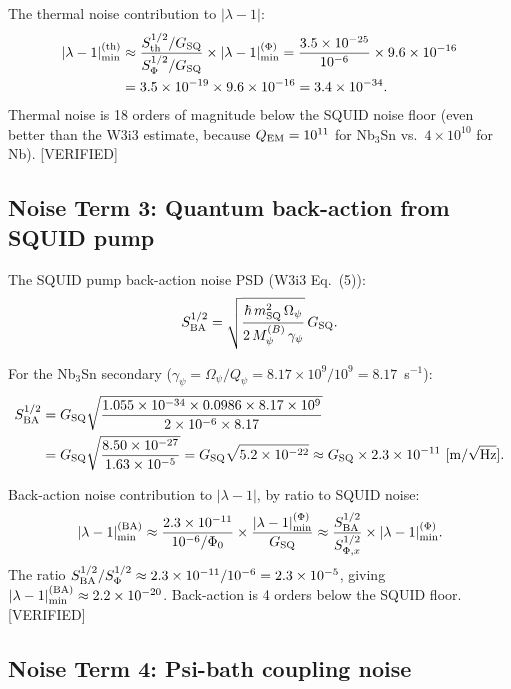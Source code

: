 \documentclass[11pt,twocolumn]{article}
\newcommand{\lam}{\lambda}
\newcommand{\Opsi}{\Omega_\psi}
\newcommand{\gpsi}{\gamma_\psi}
\newcommand{\Mpsi}{M_\psi}
\newcommand{\ee}[1]{\times 10^{#1}}
\newcommand{\Qpsi}{Q_\psi}
\theoremstyle{definition}
\theoremstyle{remark}
\begin{document}
The thermal noise contribution to $|\lam-1|$:
\begin{align}
|\lam-1|_{\rm min}^{(\rm th)}
&\approx \frac{S_{\rm th}^{1/2}/G_{\rm SQ}}{S_\Phi^{1/2}/G_{\rm SQ}}
\times|\lam-1|_{\rm min}^{(\Phi)}
= \frac{3.5\ee{-25}}{10^{-6}}\times9.6\ee{-16}
\nonumber\\
&= 3.5\ee{-19}\times9.6\ee{-16}
= 3.4\ee{-34}.
\label{eq:thermal_lambda}
\end{align}
Thermal noise is 18 orders of magnitude below the SQUID noise floor
(even better than the W3i3 estimate, because $Q_{\rm EM} = 10^{11}$
for Nb$_3$Sn vs.\ $4\ee{10}$ for Nb). [VERIFIED]

\subsection{Noise Term 3: Quantum back-action from SQUID pump}
\label{sec:noise_backaction}

The SQUID pump back-action noise PSD (W3i3 Eq.~(5)):
\begin{equation}
S_{\rm BA}^{1/2}
= \sqrt{\frac{\hbar\,m_{\rm SQ}^2\,\Opsi}
{2\,\Mpsi^{(B)}\,\gpsi}}\,G_{\rm SQ}.
\label{eq:backaction}
\end{equation}

For the Nb$_3$Sn secondary ($\gpsi = \Opsi/\Qpsi = 8.17\ee{9}/10^9 = 8.17$~s$^{-1}$):
\begin{align}
S_{\rm BA}^{1/2}
&= G_{\rm SQ}\sqrt{\frac{1.055\ee{-34}\times0.0986\times8.17\ee{9}}
{2\times10^{-6}\times8.17}}
\nonumber\\
&= G_{\rm SQ}\sqrt{\frac{8.50\ee{-27}}{1.63\ee{-5}}}
= G_{\rm SQ}\sqrt{5.2\ee{-22}}
\approx G_{\rm SQ}\times2.3\ee{-11}~[\text{m/}\sqrt{\rm Hz}].
\label{eq:BA_num}
\end{align}

Back-action noise contribution to $|\lam-1|$, by ratio to SQUID noise:
\begin{equation}
|\lam-1|_{\rm min}^{(\rm BA)}
\approx \frac{2.3\ee{-11}}{10^{-6}/\Phi_0}\times\frac{|\lam-1|_{\rm min}^{(\Phi)}}{G_{\rm SQ}}
\approx \frac{S_{\rm BA}^{1/2}}{S_{\Phi,x}^{1/2}}\times |\lam-1|_{\rm min}^{(\Phi)}.
\label{eq:BA_lambda}
\end{equation}
The ratio $S_{\rm BA}^{1/2}/S_\Phi^{1/2} \approx 2.3\ee{-11}/10^{-6}
= 2.3\ee{-5}$, giving $|\lam-1|_{\rm min}^{(\rm BA)} \approx 2.2\ee{-20}$.
Back-action is 4 orders below the SQUID floor. [VERIFIED]

\subsection{Noise Term 4: Psi-bath coupling noise}
\label{sec:noise_psi_bath}
\end{document}
